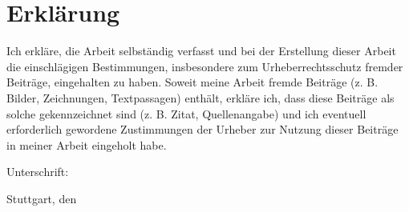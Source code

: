 
%

\chapter*{Erklärung}

  Ich erkläre, die Arbeit selbständig verfasst und bei der Erstellung dieser Arbeit die einschlägigen Bestimmungen, insbesondere zum Urheberrechtsschutz fremder Beiträge, eingehalten zu haben.
  Soweit meine Arbeit fremde Beiträge (z. B. Bilder, Zeichnungen, Textpassagen) enthält, erkläre ich, dass diese Beiträge als solche gekennzeichnet sind (z. B. Zitat, Quellenangabe) und ich eventuell erforderlich gewordene Zustimmungen der Urheber zur Nutzung dieser Beiträge in meiner Arbeit eingeholt habe.

  \vspace{10mm}

  Unterschrift:

  \vspace{15mm}

  Stuttgart, den \thesisDate

